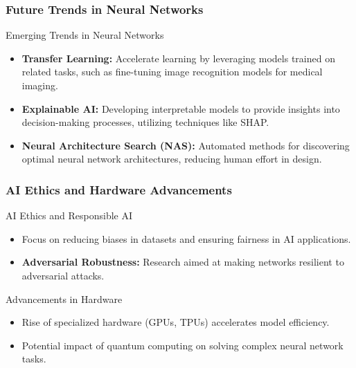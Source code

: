 \documentclass[aspectratio=169]{beamer}
\begin{document}
\begin{frame}[fragile]
    \frametitle{Future Trends in Neural Networks}
    \begin{block}{Emerging Trends in Neural Networks}
        \begin{itemize}
            \item \textbf{Transfer Learning:} Accelerate learning by leveraging models trained on related tasks, such as fine-tuning image recognition models for medical imaging.
            \item \textbf{Explainable AI:} Developing interpretable models to provide insights into decision-making processes, utilizing techniques like SHAP.
            \item \textbf{Neural Architecture Search (NAS):} Automated methods for discovering optimal neural network architectures, reducing human effort in design.
        \end{itemize}
    \end{block}
\end{frame}

\begin{frame}[fragile]
    \frametitle{AI Ethics and Hardware Advancements}
    \begin{block}{AI Ethics and Responsible AI}
        \begin{itemize}
            \item Focus on reducing biases in datasets and ensuring fairness in AI applications.
            \item \textbf{Adversarial Robustness:} Research aimed at making networks resilient to adversarial attacks.
        \end{itemize}
    \end{block}
    \begin{block}{Advancements in Hardware}
        \begin{itemize}
            \item Rise of specialized hardware (GPUs, TPUs) accelerates model efficiency.
            \item Potential impact of quantum computing on solving complex neural network tasks.
        \end{itemize}
    \end{block}
\end{frame}
\end{document}

